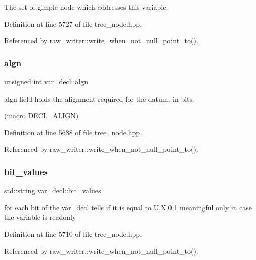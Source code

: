 The set of gimple node which addresses this variable. 



Definition at line 5727 of file tree\+\_\+node.\+hpp.



Referenced by raw\+\_\+writer\+::write\+\_\+when\+\_\+not\+\_\+null\+\_\+point\+\_\+to().

\mbox{\label{structvar__decl_a3b7aaf57d46b483a5a24dce869610137}} 
\subsubsection{\texorpdfstring{algn}{algn}}
{\footnotesize\ttfamily unsigned int var\+\_\+decl\+::algn}



algn field holds the alignment required for the datum, in bits. 

(macro D\+E\+C\+L\+\_\+\+A\+L\+I\+GN) 

Definition at line 5688 of file tree\+\_\+node.\+hpp.



Referenced by raw\+\_\+writer\+::write\+\_\+when\+\_\+not\+\_\+null\+\_\+point\+\_\+to().

\mbox{\label{structvar__decl_a1b7ca559efdbf5bb4a7bbbc36be84dbb}} 
\subsubsection{\texorpdfstring{bit\+\_\+values}{bit\_values}}
{\footnotesize\ttfamily std\+::string var\+\_\+decl\+::bit\+\_\+values}



for each bit of the \hyperlink{structvar__decl}{var\+\_\+decl} tells if it is equal to U,X,0,1 meaningful only in case the variable is readonly 



Definition at line 5710 of file tree\+\_\+node.\+hpp.



Referenced by raw\+\_\+writer\+::write\+\_\+when\+\_\+not\+\_\+null\+\_\+point\+\_\+to().

\mbox{\label{structvar__decl_a6de7749876cdf8345f0290f8105084ea}} 
